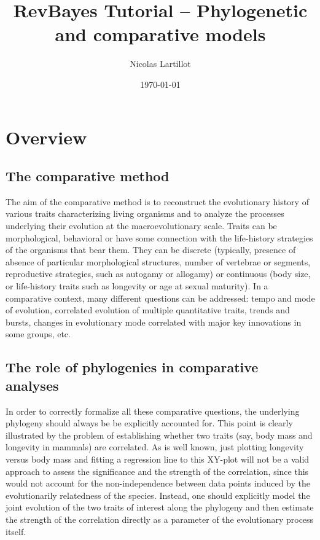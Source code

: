 \documentclass[11pt, oneside]{article}   	%
\title{RevBayes Tutorial -- Phylogenetic and comparative models}
\author{Nicolas Lartillot}
\date{\today}							%
\begin{document}
\maketitle

\section{Overview}

\subsection{The comparative method}

The aim of the comparative method is to reconstruct the evolutionary history of various traits characterizing living organisms and to analyze the processes underlying their evolution at the macroevolutionary scale.
Traits can be morphological, behavioral or have some connection with the life-history strategies of the organisms that bear them.
They can be discrete (typically, presence of absence of particular morphological structures, number of vertebrae or segments, reproductive strategies, such as autogamy or allogamy) or continuous (body size, or life-history traits such as longevity or age at sexual maturity).
In a comparative context, many different questions can be addressed: tempo and mode of evolution, correlated evolution of multiple quantitative traits, trends and bursts, changes in evolutionary mode correlated with major key innovations in some groups, etc.

\subsection{The role of phylogenies in comparative analyses}

In order to correctly formalize all these comparative questions, the underlying phylogeny should always be be explicitly accounted for. This point is clearly illustrated by the problem of establishing whether two traits (say, body mass and longevity in mammals) are correlated.
As is well known, just plotting longevity versus body mass and fitting a regression line to this XY-plot will not be a valid approach to assess the significance and the strength of the correlation, since this would not account for the non-independence between data points induced by the evolutionarily relatedness of the species.
Instead, one should explicitly model the joint evolution of the two traits of interest along the phylogeny and then estimate the strength of the correlation directly as a parameter of the evolutionary process itself.
\end{document}

